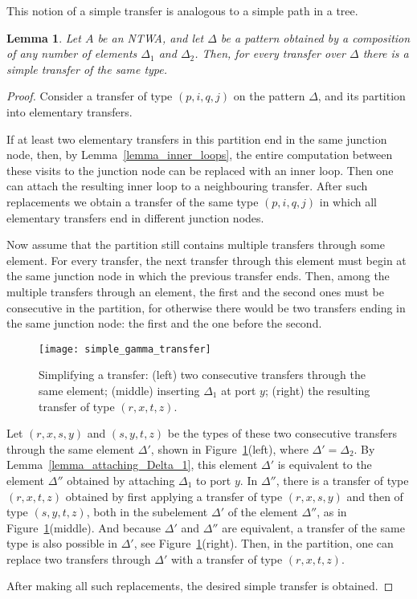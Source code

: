 \documentclass[12pt,a4paper]{article}
\newtheorem{lemma}{Lemma}
\theoremstyle{definition}
\begin{document}
This notion of a simple transfer
is analogous to a simple path in a tree.

\begin{lemma}\label{lemma_gamma_simple_path}
Let $A$ be an NTWA,
and let $\Delta$ be a pattern obtained by a composition of any number of elements $\Delta_1$ and $\Delta_2$.
Then, for every transfer over $\Delta$
there is a simple transfer of the same type.
\end{lemma}
\begin{proof}
Consider a transfer of type $(p,i,q,j)$ on the pattern $\Delta$,
and its partition into elementary transfers.

If at least two elementary transfers in this partition
end in the same junction node,
then, by Lemma~\ref{lemma_inner_loops},
the entire computation between these visits to the junction node
can be replaced with an inner loop.
Then one can
attach the resulting inner loop to a neighbouring transfer.
After such replacements we obtain a transfer of the same type $(p,i,q,j)$
in which all elementary transfers end in different junction nodes.

Now assume that the partition still contains multiple transfers through some element.
For every transfer, the next transfer 
through this element must begin at the same junction node
in which the previous transfer ends.
Then, among the multiple transfers through an element,
the first and the second ones must be consecutive in the partition,
for otherwise there would be two transfers ending in the same junction node: 
the first and the one before the second.

\begin{figure}[t]
	\centerline{\texttt{[image: simple\_gamma\_transfer]}}
	\caption{Simplifying a transfer:
		(left) two consecutive transfers through the same element;
		(middle) inserting $\Delta_1$ at port $y$;
		(right) the resulting transfer of type $(r, x, t, z)$.}
	\label{f:simple_gamma_transfer}
\end{figure}

Let $(r,x,s,y)$ and $(s,y,t,z)$ be the types of these two consecutive transfers
through the same element $\Delta'$,
shown in Figure~\ref{f:simple_gamma_transfer}(left), where $\Delta'=\Delta_2$.
By Lemma~\ref{lemma_attaching_Delta_1},
this element $\Delta'$ is equivalent to the element $\Delta''$
obtained by attaching $\Delta_1$ to port $y$.
In $\Delta''$, there is a transfer of type $(r, x, t, z)$
obtained by first applying a transfer of type $(r,x,s,y)$ and then of type $(s,y,t,z)$,
both in the subelement $\Delta'$ of the element $\Delta''$,
as in Figure~\ref{f:simple_gamma_transfer}(middle).
And because $\Delta'$ and $\Delta''$ are equivalent,
a transfer of the same type is also possible in $\Delta'$,
see Figure~\ref{f:simple_gamma_transfer}(right).
Then, in the partition,
one can replace two transfers through $\Delta'$ with a transfer of type $(r, x, t, z)$.

After making all such replacements,
the desired simple transfer is obtained.
\end{proof}
\end{document}
